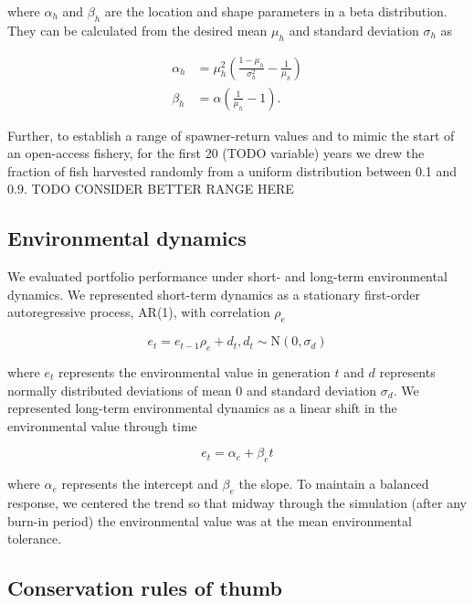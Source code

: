 \noindent where $\alpha_h$ and $\beta_h$ are the location and shape
parameters in a beta distribution. They can be calculated from the
desired mean $\mu_h$ and standard deviation $\sigma_h$ as
\citep[p.~97]{morgan1990}

\begin{align}
  \alpha_h &= \mu_h^2
                \left(
                \frac{1 - \mu_h}{\sigma_h^2} - \frac{1}{\mu_h}
                \right)\\
   \beta_h &= \alpha \left({\frac{1}{\mu_h} - 1}\right).
\end{align}

\noindent Further, to establish a range of spawner-return values and to
mimic the start of an open-access fishery, for the first 20 (TODO
variable) years we drew the fraction of fish harvested randomly from a
uniform distribution between 0.1 and 0.9. TODO CONSIDER BETTER RANGE
HERE

\subsection{Environmental dynamics}

We evaluated portfolio performance under short- and long-term
environmental dynamics. We represented short-term dynamics as a
stationary first-order autoregressive process, AR(1), with correlation
$\rho_e$

\begin{equation}
  e_t = e_{t-1} \rho_e + d_t, d_t \sim \mathrm{N}(0, \sigma_d)
\end{equation}

\noindent where $e_t$ represents the environmental value in generation
$t$ and $d$ represents normally distributed deviations of mean 0 and
standard deviation $\sigma_d$. We represented long-term environmental
dynamics as a linear shift in the environmental value through time

\begin{equation}
  e_t = \alpha_e + \beta_e t
\end{equation}

\noindent where $\alpha_e$ represents the intercept and $\beta_e$ the
slope. To maintain a balanced response, we centered the trend so that
midway through the simulation (after any burn-in period) the
environmental value was at the mean environmental tolerance.

\subsection{Conservation rules of thumb}

